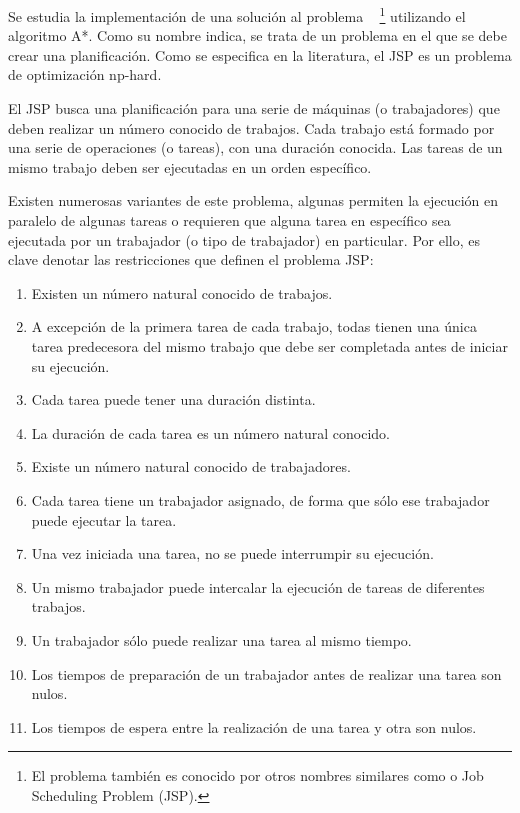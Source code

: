 Se estudia la implementación de una solución al problema
~\cite{Yan77}
\footnote{El problema también es conocido por otros nombres similares
como  o Job Scheduling Problem (JSP).}
utilizando el algoritmo A*.
Como su nombre indica, se trata de un problema en el que se debe
crear una planificación.
Como se especifica en la literatura, el JSP es un problema de optimización np-hard.

El JSP busca una planificación para una serie de
máquinas (o trabajadores) que deben realizar un número conocido
de trabajos.
Cada trabajo está formado por una serie de operaciones (o tareas),
con una duración conocida.
Las tareas de un mismo trabajo deben ser ejecutadas en un orden específico.

Existen numerosas variantes de este problema,
algunas permiten la ejecución
en paralelo de algunas tareas o requieren que alguna tarea
en específico sea ejecutada por un trabajador (o tipo de trabajador)
en particular.
Por ello, es clave denotar las restricciones que definen el problema JSP\@:

\begin{enumerate}
    \item Existen un número natural conocido de trabajos.
    \item A excepción de la primera tarea de cada trabajo,
    todas tienen una única tarea predecesora del mismo trabajo
    que debe ser completada antes de iniciar su ejecución.
    \item Cada tarea puede tener una duración distinta.
    \item La duración de cada tarea es un número natural conocido.
    \item Existe un número natural conocido de trabajadores.
    \item Cada tarea tiene un trabajador asignado,
    de forma que sólo ese trabajador puede ejecutar la tarea.
    \item Una vez iniciada una tarea, no se puede interrumpir su ejecución.
    \item Un mismo trabajador puede intercalar la ejecución de tareas de diferentes trabajos.
    \item Un trabajador sólo puede realizar una tarea al mismo tiempo.
    \item Los tiempos de preparación de un trabajador antes de realizar una tarea son nulos.
    \item Los tiempos de espera entre la realización de una tarea y otra son nulos.
\end{enumerate}

